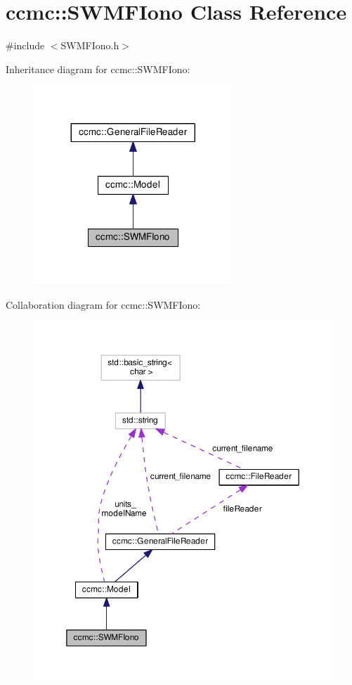\hypertarget{classccmc_1_1_s_w_m_f_iono}{\section{ccmc\-:\-:S\-W\-M\-F\-Iono Class Reference}
\label{classccmc_1_1_s_w_m_f_iono}
}


{\ttfamily \#include $<$S\-W\-M\-F\-Iono.\-h$>$}



Inheritance diagram for ccmc\-:\-:S\-W\-M\-F\-Iono\-:
\nopagebreak
\begin{figure}[H]
\begin{center}
\leavevmode
\includegraphics[width=212pt]{classccmc_1_1_s_w_m_f_iono__inherit__graph}
\end{center}
\end{figure}


Collaboration diagram for ccmc\-:\-:S\-W\-M\-F\-Iono\-:
\nopagebreak
\begin{figure}[H]
\begin{center}
\leavevmode
\includegraphics[width=350pt]{classccmc_1_1_s_w_m_f_iono__coll__graph}
\end{center}
\end{figure}
